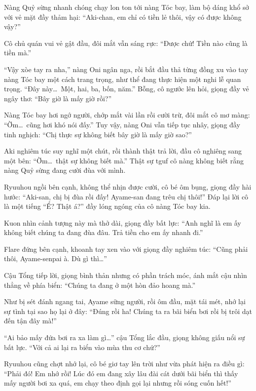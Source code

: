 \documentclass[../main.tex]{subfiles}
\begin{document}
Nàng Quỷ sừng nhanh chóng chạy lon ton tới nàng Tóc bay, làm bộ dáng khổ sở với vẻ mặt đầy thảm hại: ``Aki-chan, em chỉ có tiền lẻ thôi, vậy có được không vậy?''

Cô chủ quán vui vẻ gật đầu, đôi mắt vẫn sáng rực: ``Được chứ! Tiền nào cũng là tiền mà.''

``Vậy xòe tay ra nha,'' nàng Oni ngân nga, rồi bắt đầu thả từng đồng xu vào tay nàng Tóc bay một cách trang trọng, như thể đang thực hiện một nghi lễ quan trọng. ``Đây này\dots\ Một, hai, ba, bốn, năm.'' Bỗng, cô ngước lên hỏi, giọng đầy vẻ ngây thơ: ``Bây giờ là mấy giờ rồi?''

Nàng Tóc bay hơi ngớ người, chớp mắt vài lần rồi cười trừ, đôi mắt cô mơ màng: ``Ờm\dots\ cũng hơi khó nói đấy.'' Tuy vậy, nàng Oni vẫn tiếp tục nhây, giọng đầy tinh nghịch: ``Chị thực sự không biết bây giờ là mấy giờ sao?''

Aki nghiêm túc suy nghĩ một chút, rồi thành thật trả lời, đầu cô nghiêng sang một bên: ``Ờm\dots\ thật sự không biết mà.'' Thật sự tguf cô nàng không biết rằng nàng Quỷ sừng đang cười đùa với mình.

Ryuuhou ngồi bên cạnh, không thể nhịn được cười, cô bé ôm bụng, giọng đầy hài hước: ``Aki-san, chị bị đùa rồi đấy! Ayame-san đang trêu chị thôi!'' Đáp lại lời cô là một tiếng ``Ể? Thật á?'' đầy lóng ngóng của cô nàng Tóc bay kia.

Kuon nhìn cảnh tượng này mà thở dài, giọng đầy bất lực: ``Anh nghĩ là em ấy không biết chúng ta đang đùa đâu. Trả tiền cho em ấy nhanh đi.''

Flare đứng bên cạnh, khoanh tay xen vào với giọng đầy nghiêm túc: ``Cũng phải thôi, Ayame-senpai à. Dù gì thì\dots''

Cậu Tổng tiếp lời, giọng bình thản nhưng có phần trách móc, ánh mắt cậu nhìn thẳng về phía biển: ``Chúng ta đang ở một hòn đảo hoang mà.''


Như bị sét đánh ngang tai, Ayame sững người, rồi ôm đầu, mặt tái mét, nhớ lại sự tình tại sao họ lại ở đây: ``Đúng rồi ha! Chúng ta ra bãi biển bơi rồi bị trôi dạt đến tận đây mà!''

``Ai bảo mấy đứa bơi ra xa làm gì\dots'' cậu Tổng lắc đầu, giọng không giấu nổi sự bất lực. ``Với cả ai lại ra biển vào mùa thu cơ chứ?''

Ryuuhou cũng chợt nhớ lại, cô bé giơ tay lên trời như vừa phát hiện ra điều gì: ``Phải đó! Em nhớ rồi! Lúc đó em đang xây lâu đài cát dưới bãi biển thì thấy mấy người bơi xa quá, em chạy theo định gọi lại nhưng rồi sóng cuốn hết!''
\end{document}
